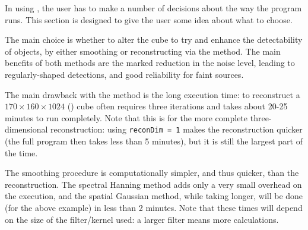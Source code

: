%
%
%
%
\label{sec-notes}

In using \duchamp, the user has to make a number of decisions about
the way the program runs. This section is designed to give the user
some idea about what to choose.


The main choice is whether to alter the cube to try and enhance the
detectability of objects, by either smoothing or reconstructing via
the \atrous method. The main benefits of both methods are the marked
reduction in the noise level, leading to regularly-shaped detections,
and good reliability for faint sources.

The main drawback with the \atrous method is the long execution time:
to reconstruct a $170\times160\times1024$ (\hipass) cube often
requires three iterations and takes about 20-25 minutes to run
completely. Note that this is for the more complete three-dimensional
reconstruction: using \texttt{reconDim = 1} makes the reconstruction
quicker (the full program then takes less than 5 minutes), but it is
still the largest part of the time.

The smoothing procedure is computationally simpler, and thus quicker,
than the reconstruction. The spectral Hanning method adds only a very
small overhead on the execution, and the spatial Gaussian method,
while taking longer, will be done (for the above example) in less than
2 minutes. Note that these times will depend on the size of the
filter/kernel used: a larger filter means more calculations.

